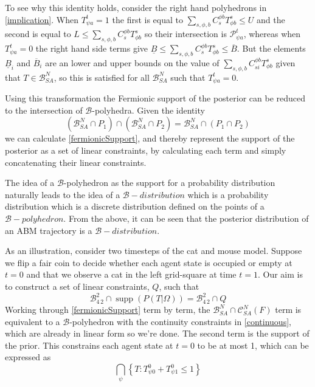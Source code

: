 \documentclass{article}
\DeclareMathOperator\supp{supp}
\begin{document}
To see why this identity holds, consider the right hand polyhedrons in \ref{implication}. When $T^t_{\psi a}=1$ the first is equal to $\sum_{s,\phi,b} C^{\phi b}_{s} T^s_{\phi b} \le U$ and the second is equal to $L \le \sum_{s,\phi,b} C^{\phi b}_{s} T^s_{\phi b}$ so their intersection is $\mathcal{P}^t_{\psi a}$, whereas when $T^t_{\psi a}=0$ the right hand side terms give $\underline{B} \le \sum_{s,\phi,b} C^{\phi b}_{s} T^s_{\phi b} \le \overline{B}$. But the elements $\underline{B}_i$ and $\overline{B}_i$ are an lower and upper bounds on the value of $\sum_{s,\phi,b} C^{\phi b}_{si} T^s_{\phi b}$ given that $T\in\mathcal{B}^N_{SA}$, so this is satisfied for all $\mathcal{B}^N_{SA}$ such that $T^t_{\psi a}=0$.

Using this transformation the Fermionic support of the posterior can be reduced to the intersection of $\mathcal{B}$-polyhedra. Given the identity
\[
(\mathcal{B}^N_{SA} \cap P_1) \cap (\mathcal{B}^N_{SA} \cap P_2) = \mathcal{B}^N_{SA} \cap (P_1 \cap P_2)
\]
we can calculate \ref{fermionicSupport}, and thereby represent the support of the posterior as a set of linear constraints, by calculating each term and simply concatenating their linear constraints.

The idea of a $\mathcal{B}$-polyhedron as the support for a probability distribution naturally leads to the idea of a $\mathcal{B}-distribution$ which is a probability distribution which is a discrete distribution defined on the points of a $\mathcal{B}-polyhedron$. From the above, it can be seen that the posterior distribution of an ABM trajectory is a $\mathcal{B}-distribution$.

As an illustration, consider two timesteps of the cat and mouse model. Suppose we flip a fair coin to decide whether each agent state is occupied or empty at $t=0$ and that we observe a cat in the left grid-square at time $t=1$. Our aim is to construct a set of linear constraints, $Q$, such that
\[
\mathcal{B}^2_{4\,2} \cap \supp(P(T|\Omega)) = \mathcal{B}^2_{4\,2} \cap Q
\]
Working through \ref{fermionicSupport} term by term, the $\mathcal{B}^N_{SA} \cap \mathcal{C}^N_{SA}(F)$ term is equivalent to a $\mathcal{B}$-polyhedron with the continuity constraints in \ref{continuous}, which are already in linear form so we're done. The second term is the support of the prior. This constrains each agent state at $t=0$ to be at most 1, which can be expressed as
\[
\bigcap_\psi \left\{T:T^0_{\psi 0} + T^0_{\psi 1} \le 1\right\}
\]
\end{document}
